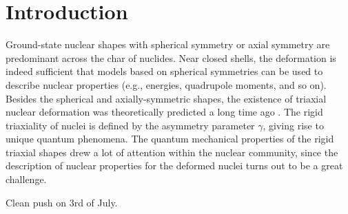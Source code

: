 \chapter{Introduction}

Ground-state nuclear shapes with spherical symmetry or axial symmetry are predominant across the char of nuclides. Near closed shells, the deformation is indeed sufficient that models based on spherical symmetries can be used to describe nuclear properties (e.g., energies, quadrupole moments, and so on). Besides the spherical and axially-symmetric shapes, the existence of triaxial nuclear deformation was theoretically predicted a long time ago \cite{bohr1998nuclear}. The rigid triaxiality of nuclei is defined by the asymmetry parameter $\gamma$, giving rise to unique quantum phenomena. The quantum mechanical properties of the rigid triaxial shapes drew a lot of attention within the nuclear community, since the description of nuclear properties for the deformed nuclei turns out to be a great challenge.

Clean push on 3rd of July.